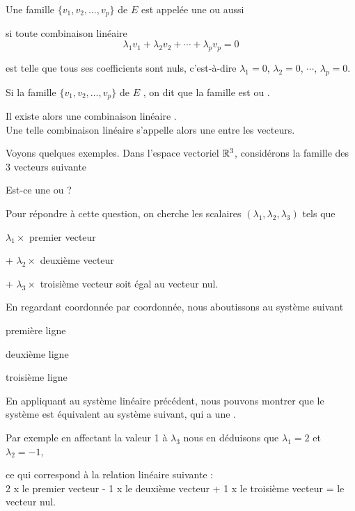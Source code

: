 \change
Une famille $\{ v_1, v_2,\ldots, v_p \}$ de $E$ est appelée une  ou 
aussi  

\change
si toute combinaison linéaire 
$$\lambda_1 v_1+\lambda_2 v_2+\cdots+\lambda_p v_p=0$$

\change
est telle que tous ses coefficients sont nuls, c'est-à-dire 
$\lambda_1=0$, $\lambda_2=0$, $\cdots$, $\lambda_p=0$. 

\change
Si la famille $\{ v_1, v_2,\ldots, v_p \}$ de $E$ , on dit que la famille est  ou .

\change
Il existe alors une combinaison linéaire 
.\\

Une telle combinaison linéaire s'appelle alors une  entre les vecteurs.

\diapo
Voyons quelques exemples.
Dans l'espace vectoriel $\mathbb{R}^3$, considérons la famille des 3 vecteurs suivante

\change
Est-ce une  ou ?

\change
Pour répondre à cette question, on cherche les scalaires $(\lambda_1, \lambda_2, \lambda_{3})$ tels que 

\change
$\lambda_1\times$ premier vecteur 

\change
+ $\lambda_2\times $ deuxi\`eme vecteur 

\change
+ $\lambda_3\times$ troisi\`eme vecteur
soit égal au vecteur nul.

\change
En regardant coordonnée par coordonnée, nous aboutissons au syst\`eme suivant

\change
premi\`ere ligne

\change
deuxi\`eme ligne

\change
troisi\`eme ligne


\diapo
En appliquant  au syst\`eme linéaire précédent, 
nous pouvons montrer que le syst\`eme est équivalent au syst\`eme suivant, 
qui a une .

\change
Par exemple en affectant la valeur 1 à $\lambda_3$ nous en déduisons que $ \lambda_1=2$ et $ \lambda_2=-1$, 

\change
ce qui correspond à la relation linéaire suivante :\\
 2 x le premier vecteur - 1 x le deuxi\`eme vecteur + 1 x le troisi\`eme vecteur = le vecteur nul.


